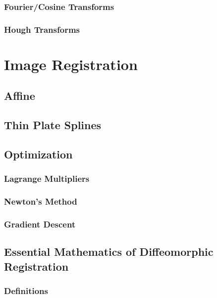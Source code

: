 \documentclass{book}
\begin{document}
				\section{Fourier/Cosine Transforms}
				\section{Hough Transforms}
				
		\part{Image Registration}
			\chapter{Affine}
			\chapter{Thin Plate Splines}
			\chapter{Optimization}
				\section{Lagrange Multipliers}
				\section{Newton's Method}
				\section{Gradient Descent}
			\chapter{Essential Mathematics of Diffeomorphic Registration}
				\section{Definitions}

	
\end{document}

